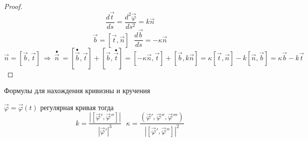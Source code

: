 \begin{proof}
  $$
  \frac{d\vec t}{ds} = \frac{d^2 \vec \varphi}{ds^2} = k \vec n
  $$
  $$
  \vec b = [\vec t, \vec n] ~~~ \frac{d\vec b}{ds} = - \kappa \vec n
  $$
  $$
  \vec n = [\vec b, \vec t] ~ \Rightarrow ~ \stackrel{\bullet}{\vec n}~ =
  [\stackrel{\bullet}{\vec b}, \vec t] + [\vec b, \stackrel{\bullet}{\vec t}]
  = [-\kappa \vec n, \vec t] + [\vec b, k \vec n] =
  \kappa[\vec t, \vec n] - k[\vec n, \vec b] =
  \kappa \vec b - k \vec t
  $$
\end{proof}

\begin{title}[\Large]
  Формулы для нахождения кривизны и кручения
\end{title}

\begin{block}
  $\vec \varphi = \vec \varphi(t)$ регулярная кривая тогда
  $$
  k = \frac{|[\vec \varphi', \vec \varphi'']|}{|\vec \varphi'|^3} ~~~
  \kappa = \frac{( \vec \varphi', \vec \varphi'', \vec \varphi''')}
  {|[\vec \varphi', \vec \varphi'']|^2}
  $$
\end{block}

